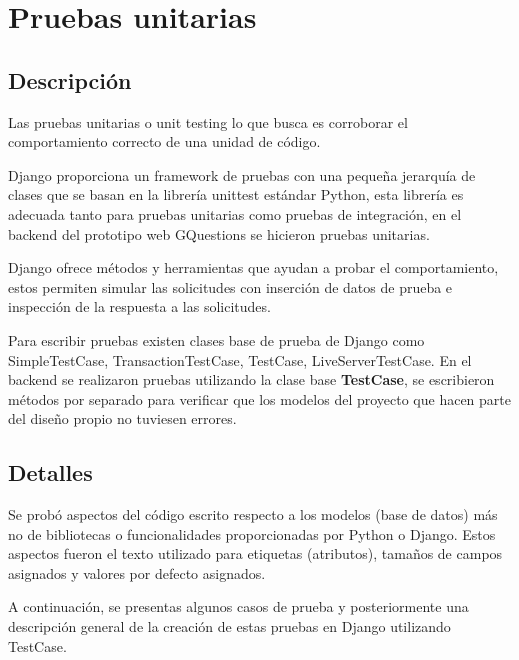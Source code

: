 \documentclass[../Main.tex]{subfiles}
\begin{document}
    \section{Pruebas unitarias}
    \subsection{Descripción}
    \begin{justify}
    Las pruebas unitarias o unit testing lo que busca es corroborar el comportamiento correcto de una unidad de código.
    
    Django proporciona un framework de pruebas con una pequeña jerarquía de clases que se basan en la librería unittest estándar Python, esta librería es adecuada tanto para pruebas unitarias como pruebas de integración, en el backend del prototipo web GQuestions se hicieron pruebas unitarias.  
    
    Django ofrece métodos y herramientas que ayudan a probar el comportamiento, estos permiten simular las solicitudes con inserción de datos de prueba e inspección de la respuesta a las solicitudes.
    
    Para escribir pruebas existen clases base de prueba de Django como SimpleTestCase, TransactionTestCase, TestCase, LiveServerTestCase. En el backend se realizaron pruebas utilizando la clase base \textbf{TestCase}, se escribieron métodos por separado para verificar que los modelos del proyecto que hacen parte del diseño propio no tuviesen errores.
    
    \subsection{Detalles}
    Se probó aspectos del código escrito respecto a los modelos (base de datos) más no de bibliotecas o funcionalidades proporcionadas por Python o Django. Estos aspectos fueron el texto utilizado para etiquetas (atributos), tamaños de campos asignados y valores por defecto asignados.
    
    A continuación, se presentas algunos casos de prueba y posteriormente una descripción general de la creación de estas pruebas en Django utilizando TestCase.
    \end{justify}
    
\end{document}
